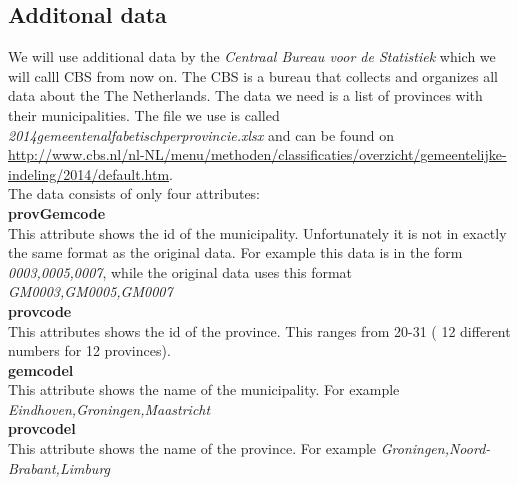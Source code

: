 \subsection{Additonal data}
We will use additional data by the \emph{Centraal Bureau voor de Statistiek} which we will calll CBS from now on.
The CBS is a bureau that collects and organizes all data about the The Netherlands.
The data we need is a list of provinces with their municipalities.
The file we use is called \emph{2014gemeentenalfabetischperprovincie.xlsx} and can be found on \url{http://www.cbs.nl/nl-NL/menu/methoden/classificaties/overzicht/gemeentelijke-indeling/2014/default.htm}.\\
The data consists of only four attributes:\\
\textbf{provGemcode} \\
This attribute shows the id of the municipality. Unfortunately it is not in exactly the same format as the original data. For example this data is in the form \emph{0003,0005,0007}, while the original data uses this format \emph{GM0003,GM0005,GM0007}\\
\textbf{provcode} \\
This attributes shows the id of the province. This ranges from 20-31 ( 12 different numbers for 12 provinces).\\
\textbf{gemcodel} \\
This attribute shows the name of the municipality. For example \emph{Eindhoven,Groningen,Maastricht} \\
\textbf{provcodel} \\
This attribute shows the name of the province. For example \emph{Groningen,Noord-Brabant,Limburg} \\ 
